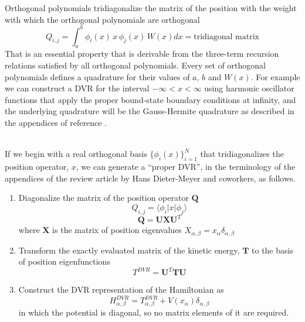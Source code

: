 \documentclass[aps,amssymb,superscriptaddress,floatfix]{revtex4}
\begin{document}
Orthogonal polynomials tridiagonalize the matrix of the position with the weight with which the orthogonal polynomials are orthogonal
\begin{equation}
Q_{i,j} = \int_a^b \phi_i(x) \, x \, \phi_j(x) \, W(x) dx = \textrm{tridiagonal matrix}
\end{equation}
That is an essential property that is derivable from the three-term recursion relations satisfied by all orthogonal polynomials.  Every set of orthogonal polynomials defines a quadrature for their values of $a$, $b$ and $W(x)$. For example we can construct a DVR for the interval $-\infty < x < \infty$ using harmonic oscillator functions that apply the proper bound-state boundary conditions at infinity, and the underlying quadrature will be the Gauss-Hermite quadrature as described in the appendices of reference  \cite{bec00:1}.
\\
\

If we begin with a real  orthogonal basis $\{\phi_i(x)\}_{i=1}^{N}$ that tridiagonalizes the position operator, $x$, we can generate a ``proper DVR'', in the terminology of the appendices of the review article \cite{bec00:1} by Hans Dieter-Meyer and coworkers, as follows.
\begin{enumerate}
\item{
Diagonalize the matrix of the position operator $\mathbf{Q}$
\begin{equation}
Q_{i,j} = \langle \phi_i|x|\phi_j\rangle
\end{equation}
\begin{equation}
\mathbf{Q}=\mathbf{U}\mathbf{X}\mathbf{U}^T
\end{equation}
where $\mathbf{X}$ is the matrix of position eigenvalues $X_{\alpha,\beta} = x_\alpha \delta_{\alpha,\beta}$
}
\item{
Transform the exactly evaluated matrix of the kinetic energy, $\mathbf{T}$ to the basis of position eigenfunctions
\begin{equation}
T^{DVR}=\mathbf{U}^T \mathbf{T} \mathbf{U}
\end{equation}
}
\item{
Construct the DVR representation of the Hamiltonian as
\begin{equation}
H^{DVR}_{\alpha,\beta} = T^{DVR}_{\alpha,\beta}+V(x_{\alpha})\delta_{\alpha,\beta}
\label{eq:DVRham}
\end{equation}
in which the potential is diagonal, so no matrix elements of it are required.
}
\end{enumerate}
\end{document}
